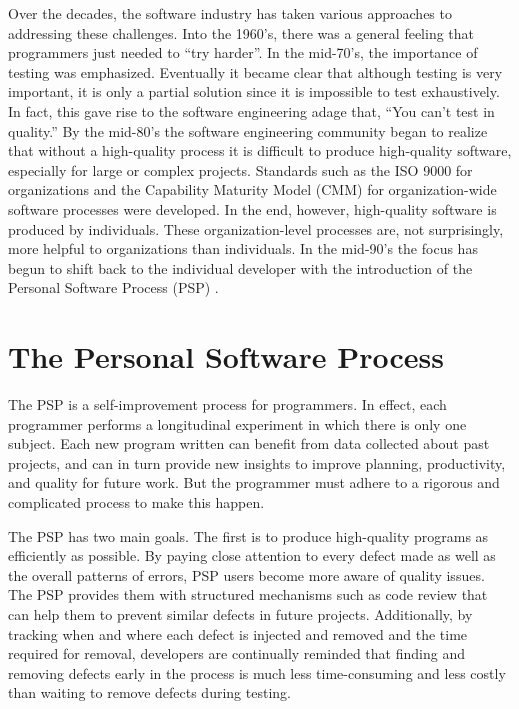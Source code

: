 Over the decades, the software industry has taken various approaches to
addressing these challenges.  Into the 1960's, there was a general feeling
that programmers just needed to ``try harder''.  In the mid-70's, the
importance of testing was emphasized. Eventually it became clear that
although testing is very important, it is only a partial solution since it
is impossible to test exhaustively. In fact, this gave rise to the software
engineering adage that, ``You can't test in quality.'' By the mid-80's the
software engineering community began to realize that without a high-quality
process it is difficult to produce high-quality software, especially for
large or complex projects.  Standards such as the ISO 9000 for
organizations and the Capability Maturity Model (CMM) for organization-wide
software processes were developed. In the end, however, high-quality
software is produced by individuals. These organization-level processes
are, not surprisingly, more helpful to organizations than individuals. In
the mid-90's the focus has begun to shift back to the individual developer
with the introduction of the Personal Software Process (PSP)
\cite{Humphrey95}.

\section{The Personal Software Process}

The PSP is a self-improvement process for programmers. In effect, each
programmer performs a longitudinal experiment in which there is only one
subject.  Each new program written can benefit from data collected about
past projects, and can in turn provide new insights to improve planning,
productivity, and quality for future work.  But the programmer must adhere
to a rigorous and complicated process to make this happen.

The PSP has two main goals.  The first is to produce high-quality programs
as efficiently as possible.  By paying close attention to every defect made
as well as the overall patterns of errors, PSP users become more aware of
quality issues.  The PSP provides them with structured mechanisms such as
code review that can help them to prevent similar defects in future
projects.  Additionally, by tracking when and where each defect is injected
and removed and the time required for removal, developers are continually
reminded that finding and removing defects early in the process is much
less time-consuming and less costly than waiting to remove defects during
testing.  


